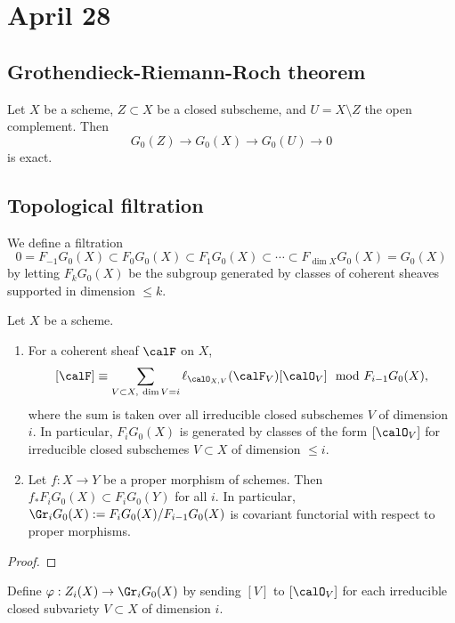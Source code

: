 \section{April 28}



\subsection{Grothendieck-Riemann-Roch theorem}


  Let $X$ be a scheme, $Z \subset X$ be a closed subscheme, and $U = X \setminus Z$ the open complement. 
  Then 
  \[ G_0(Z) \to G_0(X) \to G_0(U) \to 0 \]
  is exact.

\subsection{Topological filtration}

  We define a filtration 
  \[ 0 = F_{-1} G_0(X) \subset F_0 G_0(X) \subset F_1 G_0(X) \subset \cdots \subset F_{\dim X} G_0(X) = G_0(X) \]
  by letting $F_k G_0(X)$ be the subgroup generated by classes of coherent sheaves supported in dimension $\leq k$. 
  
  \begin{lemma}
    Let $X$ be a scheme.
    \begin{enumerate}
      \item For a coherent sheaf $\calF$ on $X$, 
        \[ [\calF] \equiv \sum_{V \subset X,\ \dim V = i} \ell_{\calO_{X,V}}(\calF_V) [\calO_V] \mod F_{i-1} G_0(X), \]
        where the sum is taken over all irreducible closed subschemes $V$ of dimension $i$.
        In particular, $F_i G_0(X)$ is generated by classes of the form $[\calO_V]$ for irreducible closed subschemes $V \subset X$ of dimension $\leq i$.
      \item Let $f:X \to Y$ be a proper morphism of schemes. 
        Then $f_* F_i G_0(X) \subset F_i G_0(Y)$ for all $i$.
        In particular, $\Gr_i G_0(X) := F_i G_0(X) / F_{i-1} G_0(X)$ is covariant functorial with respect to proper morphisms.
    \end{enumerate}
  \end{lemma}
  \begin{proof}
    \Yang{}
  \end{proof}


  Define $\varphi: Z_i(X) \to \Gr_i G_0(X)$ by sending $[V]$ to $[\calO_V]$ for each irreducible closed subvariety $V \subset X$ of dimension $i$. 
  
